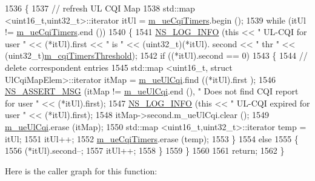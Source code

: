 \begin{DoxyCode}
1536 \{
1537   \textcolor{comment}{// refresh UL CQI  Map}
1538   std::map <uint16\_t,uint32\_t>::iterator itUl = \hyperlink{classns3_1_1MmWaveFlexTtiMaxRateMacScheduler_ae82085e6dfdc301971569ea50a4eadd0}{m\_ueCqiTimers}.begin ();
1539   \textcolor{keywordflow}{while} (itUl != \hyperlink{classns3_1_1MmWaveFlexTtiMaxRateMacScheduler_ae82085e6dfdc301971569ea50a4eadd0}{m\_ueCqiTimers}.end ())
1540     \{
1541       \hyperlink{group__logging_gafbd73ee2cf9f26b319f49086d8e860fb}{NS\_LOG\_INFO} (\textcolor{keyword}{this} << \textcolor{stringliteral}{" UL-CQI for user "} << (*itUl).first << \textcolor{stringliteral}{" is "} << (uint32\_t)(*itUl).
      second << \textcolor{stringliteral}{" thr "} << (uint32\_t)\hyperlink{classns3_1_1MmWaveFlexTtiMaxRateMacScheduler_a7f29b65f1e4a7c64cf73fe2efd02770f}{m\_cqiTimersThreshold});
1542       \textcolor{keywordflow}{if} ((*itUl).second == 0)
1543         \{
1544           \textcolor{comment}{// delete correspondent entries}
1545           std::map <uint16\_t, struct UlCqiMapElem>::iterator itMap = \hyperlink{classns3_1_1MmWaveFlexTtiMaxRateMacScheduler_a6f9a468f0c48b60d9893fed1410d18cd}{m\_ueUlCqi}.find ((*itUl).first
      );
1546           \hyperlink{assert_8h_aff5ece9066c74e681e74999856f08539}{NS\_ASSERT\_MSG} (itMap != \hyperlink{classns3_1_1MmWaveFlexTtiMaxRateMacScheduler_a6f9a468f0c48b60d9893fed1410d18cd}{m\_ueUlCqi}.end (), \textcolor{stringliteral}{" Does not find CQI report for
       user "} << (*itUl).first);
1547           \hyperlink{group__logging_gafbd73ee2cf9f26b319f49086d8e860fb}{NS\_LOG\_INFO} (\textcolor{keyword}{this} << \textcolor{stringliteral}{" UL-CQI expired for user "} << (*itUl).first);
1548           itMap->second.m\_ueUlCqi.clear ();
1549           \hyperlink{classns3_1_1MmWaveFlexTtiMaxRateMacScheduler_a6f9a468f0c48b60d9893fed1410d18cd}{m\_ueUlCqi}.erase (itMap);
1550           std::map <uint16\_t,uint32\_t>::iterator temp = itUl;
1551           itUl++;
1552           \hyperlink{classns3_1_1MmWaveFlexTtiMaxRateMacScheduler_ae82085e6dfdc301971569ea50a4eadd0}{m\_ueCqiTimers}.erase (temp);
1553         \}
1554       \textcolor{keywordflow}{else}
1555         \{
1556           (*itUl).second--;
1557           itUl++;
1558         \}
1559     \}
1560 
1561   \textcolor{keywordflow}{return};
1562 \}
\end{DoxyCode}


Here is the caller graph for this function\+:


